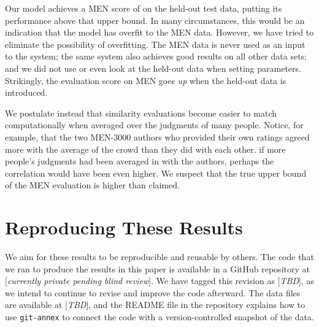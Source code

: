 \documentclass[letterpaper]{article}
\begin{document}
Our model achieves a MEN score of \scoreMEN{} on the
held-out test data, putting its performance above that upper bound. In many
circumstances, this would be an indication that the model has overfit to the
MEN data. However, we have tried to eliminate the possibility of overfitting.
The MEN data is never used as an input to the system; the same system also
achieves good results on all other data sets; and we did not use or even
look at the held-out data when setting parameters. Strikingly, the evaluation
score on MEN goes {\em up} when the held-out data is introduced.

We postulate instead that similarity evaluations become easier to match
computationally when averaged over the judgments of many people. Notice, for
example, that the two MEN-3000 authors who provided their own ratings
agreed more with the average of the crowd than they did with each other.
if more people's judgments had been averaged in with the authors, perhaps the
correlation would have been even higher. We suspect that the true upper bound
of the MEN evaluation is higher than claimed.

\section{Reproducing These Results}

We aim for these results to be reproducible and reusable by others. The code
that we ran to produce the results in this paper is available in a GitHub
repository at [{\em currently private pending blind review}]. We have tagged
this revision as [{\em TBD}], as we intend to continue to revise and improve the
code afterward. The data files are available at [{\em TBD}], and the README file
in the repository explains how to use {\tt git-annex} to connect the code
with a version-controlled snapshot of the data.

\begin{CJK*}{UTF8}{min}

\end{CJK*}
\end{document}
